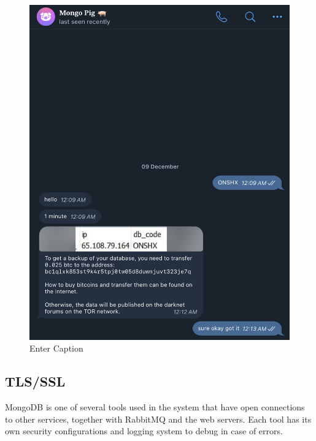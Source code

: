 \documentclass[../Main.tex]{subfiles}
\begin{document}
\begin{figure}[H]
    \centering
    \includegraphics[width=0.5\linewidth]{doc//thesis//EN//imgs/mongo-pig.png}
    \caption{Enter Caption}
    \label{fig:enter-label}
\end{figure}

\subsection{TLS/SSL}
MongoDB is one of several tools used in the system that have open connections to other services, together with RabbitMQ and the web servers. Each tool has its own security configurations and logging system to debug in case of errors. 



\end{document}
